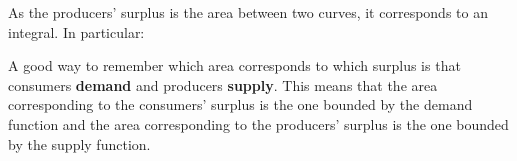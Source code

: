 \documentclass{ximera}
\begin{document}
As the producers' surplus is the area between two curves, it corresponds to an integral. In particular:

\begin{image}
\end{image}

A good way to remember which area corresponds to which surplus is that consumers {\bf demand} and producers {\bf supply}. 
This means that the area corresponding to the consumers' surplus is the one bounded by the demand function and the area 
corresponding to the producers' surplus is the one bounded by the supply function.
\end{document}
